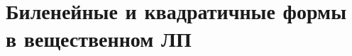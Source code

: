 \documentclass[../main.tex]{subfiles}
\begin{document}
\chapter{Биленейные и квадратичные формы в вещественном ЛП} 


\end{document}
